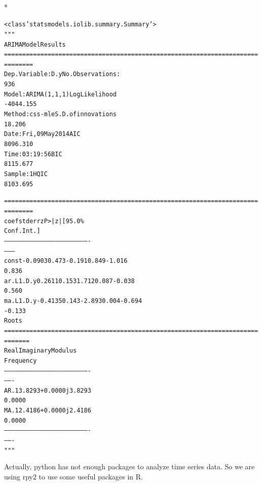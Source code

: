 \documentclass[letterpaper,10pt,english]{/Users/edwsurewin/anaconda/lib/python2.7/site-packages/sphinx/texinputs/sphinxhowto}
\def\smaller{\fontsize{9.5pt}{9.5pt}\selectfont}
\newenvironment{InvisibleVerbatim}
        {\begin{mdframed}[leftmargin=0.1\linewidth,innerleftmargin=3pt,innerrightmargin=3pt, userdefinedwidth=1\linewidth, linewidth=0pt, linecolor=white, usetwoside=false]}
        {\end{mdframed}}
\begin{document}
                \makebox[0.1\linewidth]{\smaller\hfill\tt\color{nbframe-out-prompt}Out\hspace{4pt}{[}63{]}:\hspace{4pt}}\\*
                \vspace{-2.55\baselineskip}\begin{InvisibleVerbatim}
                \vspace{-0.5\baselineskip}
\begin{alltt}<class 'statsmodels.iolib.summary.Summary'>
"""
                             ARIMA Model Results
======================================================================
========
Dep. Variable:                    D.y   No. Observations:
936
Model:                 ARIMA(1, 1, 1)   Log Likelihood
-4044.155
Method:                       css-mle   S.D. of innovations
18.206
Date:                Fri, 09 May 2014   AIC
8096.310
Time:                        03:19:56   BIC
8115.677
Sample:                             1   HQIC
8103.695

======================================================================
========
                 coef    std err          z      P>|z|      [95.0\%
Conf. Int.]
----------------------------------------------------------------------
--------
const         -0.0903      0.473     -0.191      0.849        -1.016
0.836
ar.L1.D.y      0.2611      0.153      1.712      0.087        -0.038
0.560
ma.L1.D.y     -0.4135      0.143     -2.893      0.004        -0.694
-0.133
                                    Roots
======================================================================
=======
                 Real           Imaginary           Modulus
Frequency
----------------------------------------------------------------------
-------
AR.1            3.8293           +0.0000j            3.8293
0.0000
MA.1            2.4186           +0.0000j            2.4186
0.0000
----------------------------------------------------------------------
-------
"""\end{alltt}

            \end{InvisibleVerbatim}
            
        
    
Actually, python has not enough packages to analyze time series data. So
we are using rpy2 to use some useful packages in R.

\end{document}
